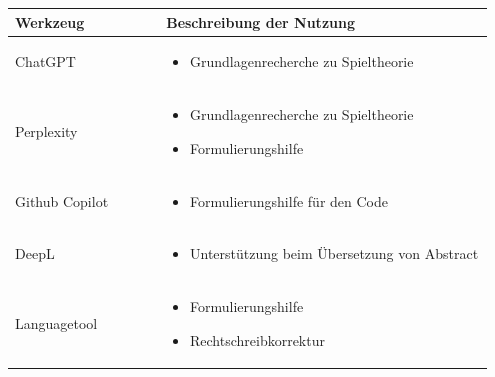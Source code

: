 \begin{table}[hbt]	
	\centering
	\renewcommand{\arraystretch}{1.5}	%
	\label{tab:anhang_uebersicht_KI_werkzeuge}
	\begin{tabular}{>{\raggedright\arraybackslash}p{0.3\linewidth} >{\raggedright\arraybackslash}p{0.65\linewidth}}
		\textbf{Werkzeug} & \textbf{Beschreibung der Nutzung}\\
		\hline 
		\hline
		ChatGPT & 	\vspace{-\topsep}
		\begin{itemize}[noitemsep,topsep=0pt,partopsep=0pt,parsep=0pt] 
			\item Grundlagenrecherche zu Spieltheorie 
			
		\end{itemize} \\
		Perplexity &	\vspace{-\topsep}
		\begin{itemize}[noitemsep,topsep=0pt,partopsep=0pt,parsep=0pt] 
			\item Grundlagenrecherche zu Spieltheorie 
			\item Formulierungshilfe
		\end{itemize} \\ 
			Github Copilot &	\vspace{-\topsep}
		\begin{itemize}[noitemsep,topsep=0pt,partopsep=0pt,parsep=0pt] 
			\item Formulierungshilfe für den Code
		\end{itemize} \\ 
		DeepL	&	\vspace{-\topsep}
		\begin{itemize}[noitemsep,topsep=0pt,partopsep=0pt,parsep=0pt] 
			\item Unterstützung beim Übersetzung von Abstract
		\end{itemize} \\ 
		Languagetool &	\vspace{-\topsep}
		\begin{itemize}[noitemsep,topsep=0pt,partopsep=0pt,parsep=0pt] 
			\item Formulierungshilfe 
			\item Rechtschreibkorrektur 
		\end{itemize} \\ 
		
		
		\hline 
	\end{tabular} 
\end{table}
\clearpage
